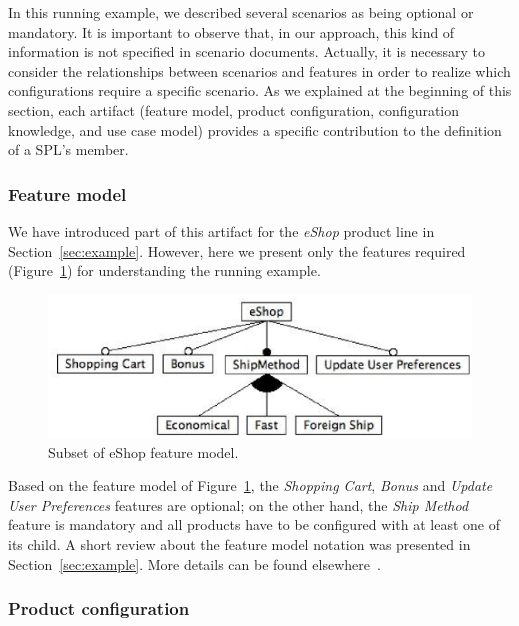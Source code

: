 \documentclass{acm_proc_article-sp}
\begin{document}
In this running example, we described several scenarios as being optional or
mandatory. It is important to observe that, in our approach, this kind of
information is not specified in scenario documents. Actually, it is necessary to
consider the relationships between scenarios and features in order to realize
which configurations require a specific scenario. As we explained at the
beginning of this section, each artifact (feature model, product configuration,
configuration knowledge, and use case model) provides a specific contribution to
the definition of a SPL's member.

\subsubsection{Feature model}

We have introduced part of this artifact for the \emph{eShop} product line in
Section~\ref{sec:example}. However, here we present only the features required 
(Figure~\ref{fig:eshop-fm-re}) for understanding the running example.

 \begin{figure}[h]
 \begin{center}
  \includegraphics[scale=0.40]{img/eShop-fm-re.eps}
   \caption{Subset of eShop feature model.}
  \label{fig:eshop-fm-re}
  \end{center}
\end{figure}

Based on the feature model of Figure~\ref{fig:eshop-fm-re}, the \emph{Shopping
Cart}, \emph{Bonus} and \emph{Update User Preferences} features are optional;
on the other hand, the \emph{Ship Method} feature is mandatory and all products
have to be configured with at least one of its child. A short review about the
feature model notation was presented in Section~\ref{sec:example}. More details
can be found elsewhere~\cite{gheyi-alloy-06,Czarnecki:2000aa}.

\subsubsection{Product configuration}\label{subsub:pc}
\end{document}
